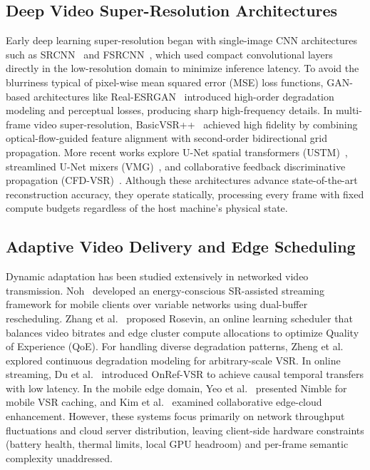 \documentclass[conference]{IEEEtran}
\begin{document}
\subsection{Deep Video Super-Resolution Architectures}
Early deep learning super-resolution began with single-image CNN architectures such as SRCNN~\cite{dong2016image} and FSRCNN~\cite{dong2016accelerating}, which used compact convolutional layers directly in the low-resolution domain to minimize inference latency. To avoid the blurriness typical of pixel-wise mean squared error (MSE) loss functions, GAN-based architectures like Real-ESRGAN~\cite{wang2021realesrgan} introduced high-order degradation modeling and perceptual losses, producing sharp high-frequency details. In multi-frame video super-resolution, BasicVSR++~\cite{chan2022basicvsrpp} achieved high fidelity by combining optical-flow-guided feature alignment with second-order bidirectional grid propagation. More recent works explore U-Net spatial transformers (USTM)~\cite{lee2025enhanced}, streamlined U-Net mixers (VMG)~\cite{tang2024vmg}, and collaborative feedback discriminative propagation (CFD-VSR)~\cite{li2026collaborative}. Although these architectures advance state-of-the-art reconstruction accuracy, they operate statically, processing every frame with fixed compute budgets regardless of the host machine's physical state.

\subsection{Adaptive Video Delivery and Edge Scheduling}
Dynamic adaptation has been studied extensively in networked video transmission. Noh~\cite{noh2023energy} developed an energy-conscious SR-assisted streaming framework for mobile clients over variable networks using dual-buffer rescheduling. Zhang et al.~\cite{zhang2026joint} proposed Rosevin, an online learning scheduler that balances video bitrates and edge cluster compute allocations to optimize Quality of Experience (QoE). For handling diverse degradation patterns, Zheng et al.~\cite{zheng2026learning} explored continuous degradation modeling for arbitrary-scale VSR. In online streaming, Du et al.~\cite{du2026onref} introduced OnRef-VSR to achieve causal temporal transfers with low latency. In the mobile edge domain, Yeo et al.~\cite{yeo2020nemo} presented Nimble for mobile VSR caching, and Kim et al.~\cite{kim2021edge} examined collaborative edge-cloud enhancement. However, these systems focus primarily on network throughput fluctuations and cloud server distribution, leaving client-side hardware constraints (battery health, thermal limits, local GPU headroom) and per-frame semantic complexity unaddressed.
\end{document}
